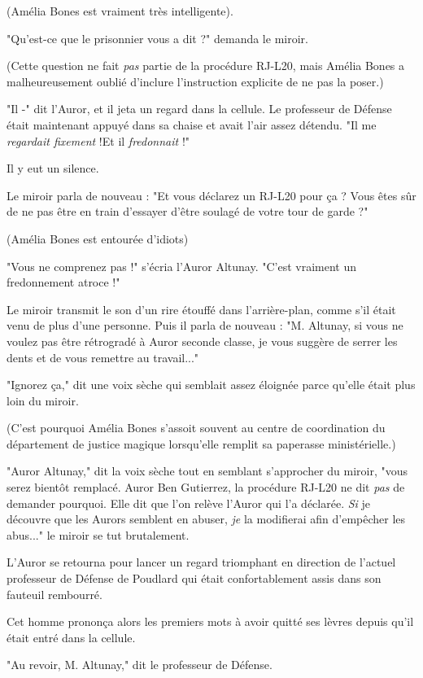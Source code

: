 (Amélia Bones est vraiment très intelligente).

"Qu'est-ce que le prisonnier vous a dit ?" demanda le miroir.

(Cette question ne fait \emph{pas}  partie de la procédure RJ-L20, mais Amélia Bones a malheureusement oublié d'inclure l'instruction explicite de ne pas la poser.)

"Il -" dit l'Auror, et il jeta un regard dans la cellule. Le professeur de Défense était maintenant appuyé dans sa chaise et avait l'air assez détendu. "Il me \emph{regardait fixement}  !Et il \emph{fredonnait } !"

Il y eut un silence.

Le miroir parla de nouveau : "Et vous déclarez un RJ-L20 pour ça ? Vous êtes sûr de ne pas être en train d'essayer d'être soulagé de votre tour de garde ?"

(Amélia Bones est entourée d'idiots)

"Vous ne comprenez pas !" s'écria l'Auror Altunay. "C'est vraiment un fredonnement atroce !"

Le miroir transmit le son d'un rire étouffé dans l'arrière-plan, comme s'il était venu de plus d'une personne. Puis il parla de nouveau : "M. Altunay, si vous ne voulez pas être rétrogradé à Auror seconde classe, je vous suggère de serrer les dents et de vous remettre au travail..."

"Ignorez ça," dit une voix sèche qui semblait assez éloignée parce qu'elle était plus loin du miroir.

(C'est pourquoi Amélia Bones s'assoit souvent au centre de coordination du département de justice magique lorsqu'elle remplit sa paperasse ministérielle.)

"Auror Altunay," dit la voix sèche tout en semblant s'approcher du miroir, "vous serez bientôt remplacé. Auror Ben Gutierrez, la procédure RJ-L20 ne dit \emph{pas}  de demander pourquoi. Elle dit que l'on relève l'Auror qui l'a déclarée. \emph{Si}  je découvre que les Aurors semblent en abuser, \emph{je}  la modifierai afin d'empêcher les abus..." le miroir se tut brutalement.

L'Auror se retourna pour lancer un regard triomphant en direction de l'actuel professeur de Défense de Poudlard qui était confortablement assis dans son fauteuil rembourré.

Cet homme prononça alors les premiers mots à avoir quitté ses lèvres depuis qu'il était entré dans la cellule.

"Au revoir, M. Altunay," dit le professeur de Défense.


